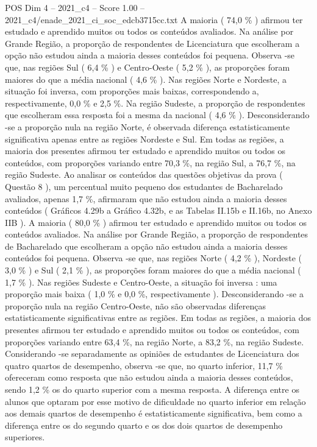 \begin{textsample}{POS Dim 4 – 2021\_c4 – Score 1.00 – 2021\_c4/enade\_2021\_ci\_soc\_edcb3715cc.txt}
A maioria ( 74,0 \% ) afirmou ter estudado e aprendido muitos ou todos os conteúdos avaliados.
Na análise por Grande Região, a proporção de respondentes de Licenciatura que escolheram a opção não estudou ainda a maioria desses conteúdos foi pequena.
Observa -se que, nas regiões Sul ( 6,4 \% ) e Centro-Oeste ( 5,2 \% ), as proporções foram maiores do que a média nacional ( 4,6 \% ).
Nas regiões Norte e Nordeste, a situação foi inversa, com proporções mais baixas, correspondendo a, respectivamente, 0,0 \% e 2,5 \%.
Na região Sudeste, a proporção de respondentes que escolheram essa resposta foi a mesma da nacional ( 4,6 \% ).
Desconsiderando -se a proporção nula na região Norte, é observada diferença estatisticamente significativa apenas entre as regiões Nordeste e Sul.
Em todas as regiões, a maioria dos presentes afirmou ter estudado e aprendido muitos ou todos os conteúdos, com proporções variando entre 70,3 \%, na região Sul, a 76,7 \%, na região Sudeste.
Ao analisar os conteúdos das questões objetivas da prova ( Questão 8 ), um percentual muito pequeno dos estudantes de Bacharelado avaliados, apenas 1,7 \%, afirmaram que não estudou ainda a maioria desses conteúdos ( Gráficos 4.29b a Gráfico 4.32b, e as Tabelas II.15b e II.16b, no Anexo IIB ).
A maioria ( 80,0 \% ) afirmou ter estudado e aprendido muitos ou todos os conteúdos avaliados.
Na análise por Grande Região, a proporção de respondentes de Bacharelado que escolheram a opção não estudou ainda a maioria desses conteúdos foi pequena.
Observa -se que, nas regiões Norte ( 4,2 \% ), Nordeste ( 3,0 \% ) e Sul ( 2,1 \% ), as proporções foram maiores do que a média nacional ( 1,7 \% ).
Nas regiões Sudeste e Centro-Oeste, a situação foi inversa : uma proporção mais baixa ( 1,0 \% e 0,0 \%, respectivamente ).
Desconsiderando -se a proporção nula na região Centro-Oeste, não são observadas diferenças estatisticamente significativas entre as regiões.
Em todas as regiões, a maioria dos presentes afirmou ter estudado e aprendido muitos ou todos os conteúdos, com proporções variando entre 63,4 \%, na região Norte, a 83,2 \%, na região Sudeste.
Considerando -se separadamente as opiniões de estudantes de Licenciatura dos quatro quartos de desempenho, observa -se que, no quarto inferior, 11,7 \% ofereceram como resposta que não estudou ainda a maioria desses conteúdos, sendo 1,2 \% os do quarto superior com a mesma resposta.
A diferença entre os alunos que optaram por esse motivo de dificuldade no quarto inferior em relação aos demais quartos de desempenho é estatisticamente significativa, bem como a diferença entre os do segundo quarto e os dos dois quartos de desempenho superiores.

\end{textsample}
